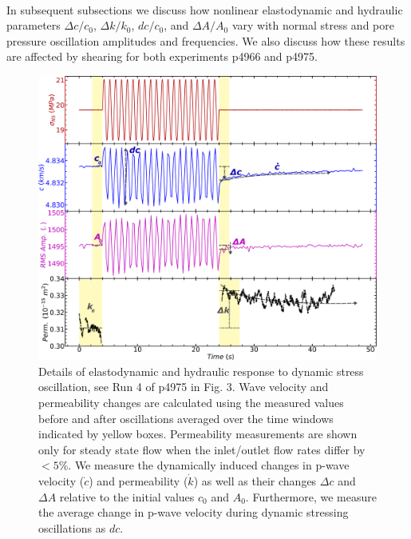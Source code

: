 \documentclass[letterpaper,10pt]{article}
\begin{document}

\paragraph{}
In subsequent subsections we discuss how nonlinear elastodynamic and hydraulic parameters $\Delta c/c_0$, $ \Delta k/k_0 $, $dc/c_0$, and $\Delta A/A_0$ vary with normal stress and pore pressure oscillation amplitudes and frequencies. We also discuss how these results are affected by shearing for both experiments p4966 and p4975.

\newpage

\begin{figure}[ht]
	\centering
	\includegraphics[width=0.9\columnwidth]{NsVelRmsPerm_v2_edit}
	\caption[]{Details of elastodynamic and hydraulic response to dynamic stress oscillation, see Run 4 of p4975 in Fig. 3. Wave velocity and permeability changes are calculated using the measured values before and after oscillations averaged over the time windows indicated by yellow boxes. Permeability measurements are shown only for steady state flow when the inlet/outlet flow rates differ by $ < 5 \% $. We measure the dynamically induced changes in p-wave velocity ($ \dot c$) and permeability ($\dot k$) as well as their changes $\Delta c$ and $\Delta A$ relative to the initial values $c_0$ and $A_0$. Furthermore, we measure the average change in p-wave velocity during dynamic stressing oscillations as $ dc $.}
	\label{fig:delc_delk_calc}
\end{figure}
\end{document}
